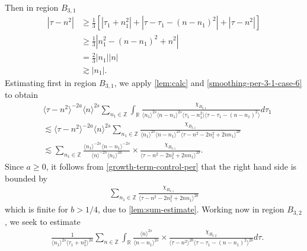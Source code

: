 \documentclass[12pt,reqno]{amsart}
\numberwithin{equation}{section}  %
\numberwithin{figure}{section}
\newcommand{\rr}{\mathbb{R}}
\newcommand{\zz}{\mathbb{Z}}
\theoremstyle{plain}
\theoremstyle{definition}
\theoremstyle{remark}
\begin{document}
Then in region $B_{3,1}$
\begin{equation}
\begin{split}
  | \tau - n^{2} |
  & \ge \frac{1}{3}\left[ | \tau_{1} + n_{1}^{2} | + | \tau -
  \tau_{1} - (n - n_{1})^{2}
  | + | \tau - n^{2} | \right]
  \\
  & \ge \frac{1}{3} |  n_{1}^{2} - (n - n_{1})^{2} + n^{2} |
  \\
  & = \frac{2}{3} | n_{1} | | n |
  \\
  & \gtrsim | n_{1} |.
\end{split}
\label{smoothing-per-3-1-case-6}
\end{equation}
%
%
Estimating first in region
$B_{3,1}$, we apply \autoref{lem:calc} and \eqref{smoothing-per-3-1-case-6}
to obtain
%
%
%
%
\begin{equation}
  \label{region-a31-case-6}
\begin{split}
& \langle \tau - n^{2}  \rangle ^{-2a} \langle n
    \rangle ^{2s}
    \sum_{n_{1} \in \zz} \int_{\rr} \frac{\chi_{B_{3,1}}}{ \langle n_{1} \rangle ^{2s} \langle n-n_{1} \rangle ^{2s} 
\langle \tau_{1} - n_{1}^{2}  \rangle \langle  \tau - \tau_{1} - (n -
n_{1})^{2}  \rangle}
d \tau_1 
\\
& \lesssim \langle \tau - n^{2} \rangle ^{-2a} \langle n \rangle ^{2s}
\sum_{n_{1} \in
\zz}  \frac{\chi_{B_{3,1}}}{\langle n_{1} \rangle ^{2s} \langle n - n_{1} \rangle
^{2s} \langle \tau - n^{2} - 2n_{1}^{2} + 2nn_{1}  \rangle ^{2b}}
\\
& \lesssim 
\sum_{n_{1} \in
\zz}  \frac{\langle n_1 \rangle ^{-2s} \langle n - n_{1} \rangle ^{-2s}}{\langle
n \rangle ^{-2s} \langle n_{1} \rangle
^{2a}} \times \frac{\chi_{B_{3,1}}}{\langle \tau - n^{2} - 2n_{1}^{2} + 2nn_{1}
\rangle ^{2b}}.
\end{split}
\end{equation}
%
%
Since $a \ge 0$, it follows from \eqref{growth-term-control-per} that the right
hand side is bounded by
%
%
%
%
\begin{equation*}
\begin{split}
\sum_{n_{1} \in
\zz} \frac{\chi_{B_{3,1}}}{\langle \tau - n^{2} - 2n_{1}^{2} + 2nn_{1}
\rangle ^{2b}}
\end{split}
\end{equation*}
%
%
%
%
%
%
which is finite for $b > 1/4$, due to \autoref{lem:sum-estimate}. 
Working now in region $B_{3,2}$, we seek to estimate 
\begin{equation}
  \label{region-B-3-split-3}
\begin{split}
  &  \frac{1}{\langle n_{1} \rangle ^{2s}
  \langle \tau_{1} + n_{1}^{2} \rangle
  ^{2a}} \sum_{n \in \zz} \int_{\rr} \frac{\langle n \rangle ^{2s}}{\langle
  n - n_{1}\rangle ^{2s}}  \times \frac{\chi_{B_{3,2}}}{\langle
  \tau - n^{2} \rangle ^{2b} \langle \tau - \tau_{1} - (n - n_{1})^{2} \rangle
  ^{2b}} d \tau.
\end{split}
\end{equation}
\end{document}

